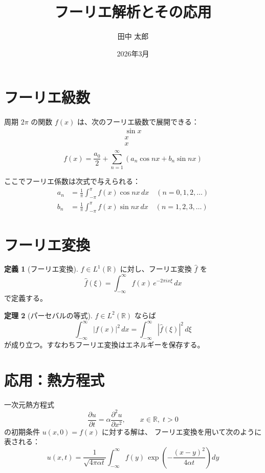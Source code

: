 \documentclass[11pt]{article}
\title{フーリエ解析とその応用}
\author{田中 太郎}
\date{2026年3月}
\theoremstyle{definition}
\newtheorem{theorem}{定理}
\newtheorem{definition}[theorem]{定義}
\begin{document}
\maketitle

\section{フーリエ級数}

周期 $2\pi$ の関数 $f(x)$ は、次のフーリエ級数で展開できる：
\begin{align*}
\sin x \\
x \\
x \\
\end{align*}
\begin{equation}
  f(x) = \frac{a_0}{2} + \sum_{n=1}^{\infty}
  \left( a_n \cos nx + b_n \sin nx \right)
\end{equation}

ここでフーリエ係数は次式で与えられる：
\begin{align}
  a_n & = \frac{1}{\pi} \int_{-\pi}^{\pi} f(x) \cos nx \, dx
  \quad (n = 0, 1, 2, \ldots)                                \\
  b_n & = \frac{1}{\pi} \int_{-\pi}^{\pi} f(x) \sin nx \, dx
  \quad (n = 1, 2, 3, \ldots)
\end{align}

\section{フーリエ変換}

\begin{definition}[フーリエ変換]
  $f \in L^1(\mathbb{R})$ に対し、フーリエ変換 $\hat{f}$ を
  \begin{equation}
    \hat{f}(\xi) = \int_{-\infty}^{\infty}
    f(x)\, e^{-2\pi i x \xi} \, dx
  \end{equation}
  で定義する。
\end{definition}

\begin{theorem}[パーセバルの等式]
  $f \in L^2(\mathbb{R})$ ならば
  \begin{equation}
    \int_{-\infty}^{\infty} |f(x)|^2 \, dx
    = \int_{-\infty}^{\infty} |\hat{f}(\xi)|^2 \, d\xi
  \end{equation}
  が成り立つ。すなわちフーリエ変換はエネルギーを保存する。
\end{theorem}

\section{応用：熱方程式}

一次元熱方程式
\begin{equation}
  \frac{\partial u}{\partial t}
  = \alpha \frac{\partial^2 u}{\partial x^2},
  \qquad x \in \mathbb{R},\; t > 0
\end{equation}
の初期条件 $u(x,0) = f(x)$ に対する解は、
フーリエ変換を用いて次のように表される：
\begin{equation}
  u(x,t) = \frac{1}{\sqrt{4\pi\alpha t}}
  \int_{-\infty}^{\infty}
  f(y)\, \exp\!\left( -\frac{(x-y)^2}{4\alpha t} \right) dy
\end{equation}
\end{document}
